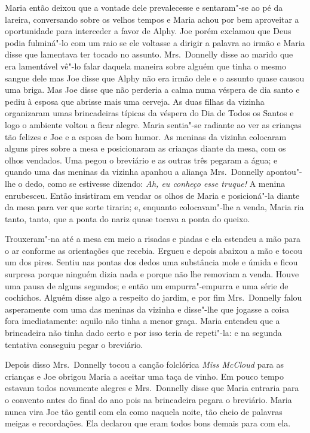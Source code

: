 Maria então deixou que a vontade dele prevalecesse e sentaram"-se ao pé da
lareira, conversando sobre os velhos tempos e Maria achou por bem aproveitar a
oportunidade para interceder a favor de Alphy.  Joe porém exclamou que Deus
podia fulminá"-lo com um raio se ele voltasse a dirigir a palavra ao irmão e
Maria disse que lamentava ter tocado no assunto.  Mrs.~Donnelly disse ao marido
que era lamentável vê"-lo falar daquela maneira sobre alguém que tinha o mesmo
sangue dele mas Joe disse que Alphy não era irmão dele e o assunto quase causou
uma briga.  Mas Joe disse que não perderia a calma numa véspera de dia santo e
pediu à esposa que abrisse mais uma cerveja.  As duas filhas da vizinha
organizaram umas brincadeiras típicas da véspera do Dia de Todos os Santos e
logo o ambiente voltou a ficar alegre.  Maria sentia"-se radiante ao ver as
crianças tão felizes e Joe e a esposa de bom humor.  As meninas da vizinha
colocaram alguns pires sobre a mesa e posicionaram as crianças diante da mesa,
com os olhos vendados.  Uma pegou o breviário e as outras três pegaram a água;
e quando uma das meninas da vizinha apanhou a aliança Mrs.~Donnelly apontou"-lhe
o dedo, como se estivesse dizendo: \textit{Ah, eu conheço esse truque!}  A
menina enrubesceu.  Então insistiram em vendar os olhos de Maria e posicioná"-la
diante da mesa para ver que sorte tiraria; e, enquanto colocavam"-lhe a venda,
Maria ria tanto, tanto, que a ponta do nariz quase tocava a ponta do queixo.

Trouxeram"-na até a mesa em meio a risadas e piadas e ela estendeu a mão
para o ar conforme as orientações que recebia.  Ergueu e depois abaixou a mão e
tocou um dos pires.  Sentiu nas pontas dos dedos uma substância mole e úmida e
ficou surpresa porque ninguém dizia nada e porque não lhe removiam a venda.
Houve uma pausa de alguns segundos; e então um empurra"-empurra e uma série de
cochichos.  Alguém disse algo a respeito do jardim, e por fim Mrs.~Donnelly
falou asperamente com uma das meninas da vizinha e disse"-lhe que jogasse a
coisa fora imediatamente: aquilo não tinha a menor graça.  Maria entendeu que a
brincadeira não tinha dado certo e por isso teria de repeti"-la: e na segunda
tentativa conseguiu pegar o breviário.

Depois disso Mrs.~Donnelly tocou a canção folclórica \textit{Miss McCloud} para
as crianças e Joe obrigou Maria a aceitar uma taça de vinho.  Em pouco tempo
estavam todos novamente alegres e Mrs.~Donnelly disse que Maria entraria para o
convento antes do final do ano pois na brincadeira pegara o breviário.  Maria
nunca vira Joe tão gentil com ela como naquela noite, tão cheio de palavras
meigas e recordações.  Ela declarou que eram todos bons demais para com ela.

